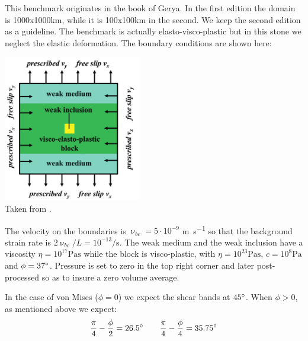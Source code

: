 This benchmark originates in the book of Gerya. In the first edition the domain is 1000x1000km, 
while it is 100x100km in the second. We keep the second edition as a guideline. The benchmark
is actually elasto-visco-plastic but in this stone we neglect the elastic deformation. The 
boundary conditions are shown here:

\begin{center}
\includegraphics[width=6cm]{python_codes/fieldstone_39/results_shortening_block/setup}\\
{\captionfont Taken from \cite{gery19book}.}
\end{center}

The velocity on the boundaries is $\upnu_{bc}=5\cdot 10^{-9}$ \si{\metre\per\second} so that the background strain rate is 
$2 \upnu_{bc}/L = 10^{-13}\si{\per\second}$.
The weak medium and the weak inclusion have a viscosity $\eta=10^{17}\si{\pascal\second}$ while 
the block is visco-plastic, with $\eta=10^{23}\si{\pascal\second}$, $c=10^8\si{\pascal}$ 
and $\phi=37\degree$. 
Pressure is set to zero in the top right corner and later post-processed so as to insure a zero 
volume average.

In the case of von Mises ($\phi=0$) we expect the shear bands at $45\degree$. When $\phi>0$, as mentioned above
we expect:
\[
\frac{\pi}{4}-\frac{\phi}{2}=26.5\degree
\qquad
\frac{\pi}{4}-\frac{\phi}{4}=35.75\degree
\]

